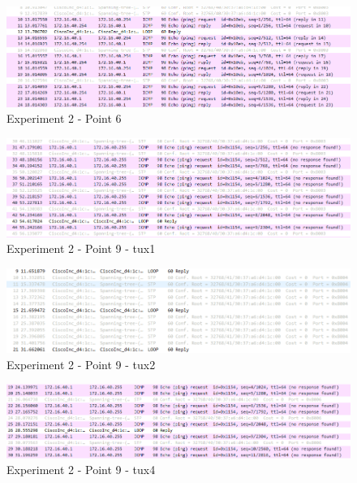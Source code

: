 \documentclass[a4paper]{article}
\begin{document}
	\begin{figure}[H]
	\begin{center}
  	\includegraphics[width=\linewidth]{exp2_6_t2.png}
  	\caption{Experiment 2 - Point 6}
  	\label{fig:Experiment 2 - Point 6}
	\end{center}
	\end{figure}

	\begin{figure}[H]
	\begin{center}
  	\includegraphics[width=\linewidth]{exp2_9_tux1.png}
  	\caption{Experiment 2 - Point 9 - tux1}
  	\label{fig:Experiment 2 - Point 9 - tux1}
	\end{center}
	\end{figure}

	\begin{figure}[H]
	\begin{center}
  	\includegraphics[width=\linewidth]{exp2_9_tux2.png}
  	\caption{Experiment 2 - Point 9 - tux2}
  	\label{fig:Experiment 2 - Point 9 - tux2}
	\end{center}
	\end{figure}

	\begin{figure}[H]
	\begin{center}
  	\includegraphics[width=\linewidth]{exp2_9_tux4.png}
  	\caption{Experiment 2 - Point 9 - tux4}
  	\label{fig:Experiment 2 - Point 9 - tux4}
	\end{center}
	\end{figure}
\end{document}
